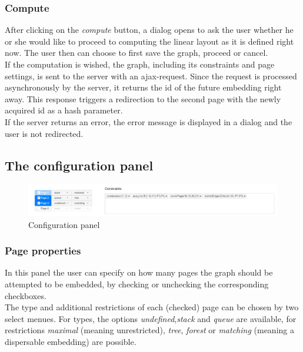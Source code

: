 {\subsubsection{Compute}
After clicking on the \textit{compute} button, a dialog opens to ask the user whether he or she would like to proceed to computing the linear layout as it is defined right now. The user then can choose to first save the graph, proceed or cancel.\\
If the computation is wished, the graph, including its constraints and page settings, is sent to the server with an ajax-request. Since the request is processed asynchronously by the server, it returns the id of the future embedding right away. This response triggers a redirection to the second page with the newly acquired id as a hash parameter.\\
If the server returns an error, the error message is displayed in a dialog and the user is not redirected.
\subsection{The configuration panel}
\begin{figure}[!h]
\begin{center}
\includegraphics[width=1\textwidth]{figures/figIndex/ConfigPanel.jpg}
\caption{Configuration panel}
\label{img:confPan}
\end{center}
\end{figure}
\subsubsection{Page properties}
\label{imp_pages}
In this panel the user can specify on how many pages the graph should be attempted to be embedded, by checking or unchecking the corresponding checkboxes.\\
The type and additional restrictions of each (checked) page can be chosen by two select menues. For types, the options \textit{undefined},\textit{stack} and \textit{queue} are available, for restrictions \textit{maximal} (meaning unrestricted), \textit{tree}, \textit{forest} or \textit{matching} (meaning a dispersable embedding) are possible.
}
